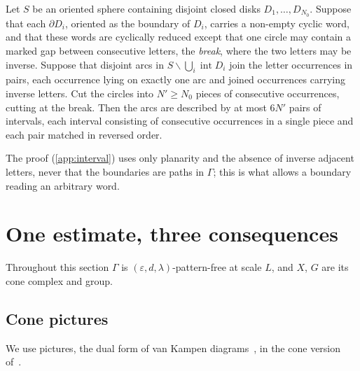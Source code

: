 \documentclass[11pt]{article}
\theoremstyle{definition}
\theoremstyle{plain}
\newcommand{\eps}{\varepsilon}
\begin{document}
\begin{lemma}\label{lem:interval}
Let $S$ be an oriented sphere containing disjoint closed disks $D_1,\dots,D_{N_0}$. Suppose that each $\partial D_i$, oriented as the boundary of $D_i$, carries a non-empty cyclic word, and that these words are cyclically reduced except that one circle may contain a marked gap between consecutive letters, the \emph{break}, where the two letters may be inverse. Suppose that disjoint arcs in $S\smallsetminus\bigcup_i\operatorname{int}D_i$ join the letter occurrences in pairs, each occurrence lying on exactly one arc and joined occurrences carrying inverse letters. Cut the circles into $N'\ge N_0$ pieces of consecutive occurrences, cutting at the break. Then the arcs are described by at most $6N'$ pairs of intervals, each interval consisting of consecutive occurrences in a single piece and each pair matched in reversed order.
\end{lemma}

The proof (\cref{app:interval}) uses only planarity and the absence of inverse adjacent letters, never that the boundaries are paths in $\Gamma$; this is what allows a boundary reading an arbitrary word.

\section{One estimate, three consequences}\label{sec:key}

Throughout this section $\Gamma$ is $(\eps,d,\lambda)$-pattern-free at scale $L$, and $X$, $G$ are its cone complex and group.

\subsection{Cone pictures}
We use pictures, the dual form of van Kampen diagrams~\cite{vanKampen1933,Rourke1979,CollinsHuebschmann1982,Pride1991,BogleyPride1993}, in the cone version of~\cite[\S5.1]{OAI196}.
\end{document}
